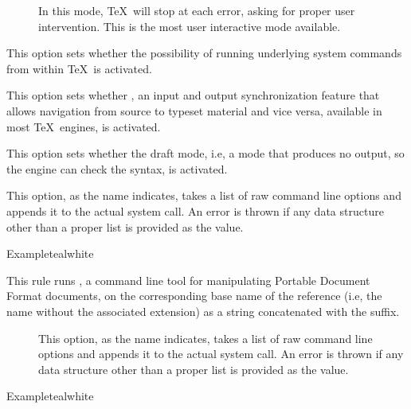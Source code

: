 \begin{description}
\begin{description}
\begin{description}
\item[] In this mode, \TeX\ will stop at each error, asking for proper user intervention. This is the most user interactive mode available.
\end{description}

\item[\rpsbox{shell}] This option sets whether the possibility of running underlying system commands from within \TeX\ is activated.

\item[\rpsbox{synctex}] This option sets whether , an input and output synchronization feature that allows navigation from source to typeset material and vice versa, available in most \TeX\ engines, is activated.

\item[\rpsbox{draft}] This option sets whether the draft mode, i.e, a mode that produces no output, so the engine can check the syntax, is activated.

\item[\abox{options}] This option, as the name indicates, takes a list of raw command line options and appends it to the actual system call. An error is thrown if any data structure other than a proper list is provided as the value.
\end{description}

\begin{codebox}{Example}{teal}{\icnote}{white}
\end{codebox}

\item[\rulebox{pdftk}]
This rule runs , a command line tool for manipulating Portable Document Format documents, on the corresponding base name of the  reference (i.e, the name without the associated extension) as a string concatenated with the  suffix.

\begin{description}
\item[] This option, as the name indicates, takes a list of raw command line options and appends it to the actual system call. An error is thrown if any data structure other than a proper list is provided as the value.
\end{description}

\begin{codebox}{Example}{teal}{\icnote}{white}
\end{codebox}


\end{description}
